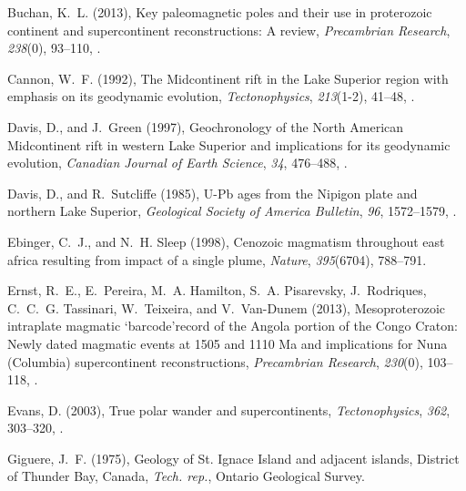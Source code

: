 \documentclass[draft,gc]{AGUTeX}
\begin{document}
\begin{article}
\begin{thebibliography}{24}
Buchan, K.~L. (2013), Key paleomagnetic poles and their use in proterozoic
  continent and supercontinent reconstructions: A review, \textit{Precambrian
  Research}, \textit{238}(0), 93--110,
  .

Cannon, W.~F. (1992), The {Midcontinent rift in the Lake Superior} region with
  emphasis on its geodynamic evolution, \textit{Tectonophysics},
  \textit{213}(1-2), 41--48, .

Davis, D., and J.~Green (1997), Geochronology of the {N}orth {A}merican
  {M}idcontinent rift in western {L}ake {S}uperior and implications for its geodynamic evolution, \textit{Canadian Journal of Earth Science},
  \textit{34}, 476--488, .

Davis, D., and R.~Sutcliffe (1985), {U}-{P}b ages from the {N}ipigon plate and
  northern {L}ake {S}uperior, \textit{Geological Society of America Bulletin},
  \textit{96}, 1572--1579,
  .
  
Ebinger, C.~J., and N.~H. Sleep (1998), Cenozoic magmatism throughout east
  africa resulting from impact of a single plume, \textit{Nature},
  \textit{395}(6704), 788--791.

Ernst, R.~E., E.~Pereira, M.~A. Hamilton, S.~A. Pisarevsky, J.~Rodriques,
  C.~C.~G. Tassinari, W.~Teixeira, and V.~Van-Dunem (2013), {Mesoproterozoic
  intraplate magmatic `barcode'record of the Angola portion of the Congo
  Craton: Newly dated magmatic events at 1505 and 1110 Ma and implications for
  Nuna (Columbia) supercontinent reconstructions}, \textit{Precambrian
  Research}, \textit{230}(0), 103--118, .

Evans, D. (2003), True polar wander and supercontinents,
  \textit{Tectonophysics}, \textit{362}, 303--320,
  .

Giguere, J.~F. (1975), {Geology of St. Ignace Island and adjacent islands,
  District of Thunder Bay, Canada}, \textit{Tech. rep.}, Ontario Geological
  Survey.


\end{thebibliography}
\end{article}
\end{document}

